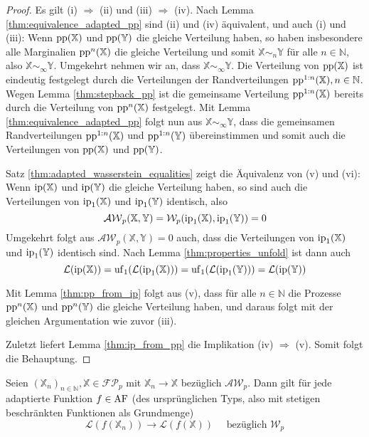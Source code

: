    \begin{proof}
        Es gilt (i) $\Rightarrow$ (ii) und (iii) $\Rightarrow$ (iv). Nach Lemma \ref{thm:equivalence_adapted_pp} sind (ii) und (iv) äquivalent, und auch (i) und (iii): Wenn $\operatorname{pp}(\mathbb{X})$ und $\operatorname{pp}(\mathbb{Y})$ die gleiche Verteilung haben, so haben insbesondere alle Marginalien $\operatorname{pp}^n(\mathbb{X})$ die gleiche Verteilung und somit $\mathbb{X}\sim_n \mathbb{Y}$ für alle $n\in\mathbb{N}$, also $\mathbb{X} \sim_{\infty} \mathbb{Y}$. Umgekehrt nehmen wir an, dass $\mathbb{X}\sim_{\infty}\mathbb{Y}$. Die Verteilung von $\operatorname{pp}(\mathbb{X})$ ist eindeutig festgelegt durch die Verteilungen der Randverteilungen $\operatorname{pp}^{1:n}(\mathbb{X}), n\in\mathbb{N}$. Wegen Lemma \ref{thm:stepback_pp} ist die gemeinsame Verteilung $\operatorname{pp}^{1:n}(\mathbb{X})$ bereits durch die Verteilung von $\operatorname{pp}^n(\mathbb{X})$ festgelegt. Mit Lemma \ref{thm:equivalence_adapted_pp} folgt nun aus $\mathbb{X} \sim_\infty\mathbb{Y}$, dass die gemeinsamen Randverteilungen $\operatorname{pp}^{1:n}(\mathbb{X})$ und $\operatorname{pp}^{1:n}(\mathbb{Y})$ übereinstimmen und somit auch die Verteilungen von $\operatorname{pp}(\mathbb{X})$ und $\operatorname{pp}(\mathbb{Y})$.

        Satz \ref{thm:adapted_wasserstein_equalities} zeigt die Äquivalenz von (v) und (vi): Wenn $\operatorname{ip}(\mathbb{X})$ und $\operatorname{ip}(\mathbb{Y})$ die gleiche Verteilung haben, so sind auch die Verteilungen von $\operatorname{ip}_1(\mathbb{X})$ und $\operatorname{ip}_1(\mathbb{Y})$ identisch, also
        $$\mathcal{AW}_p(\mathbb{X,Y}) = \mathcal{W}_p(\operatorname{ip}_1(\mathbb{X}), \operatorname{ip}_1(\mathbb{Y})) = 0$$
        Umgekehrt folgt aus $\mathcal{AW}_p(\mathbb{X}, \mathbb{Y})=0$ auch, dass die Verteilungen von $\operatorname{ip}_1(\mathbb{X})$ und $\operatorname{ip}_1(\mathbb{Y})$ identisch sind. Nach Lemma \ref{thm:properties_unfold} ist dann auch
        $$\mathcal{L}(\operatorname{ip}(\mathbb{X})) = \operatorname{uf}_1(\mathcal{L}(\operatorname{ip}_1(\mathbb{X}))) = \operatorname{uf}_1(\mathcal{L}(\operatorname{ip}_1(\mathbb{Y}))) = \mathcal{L}(\operatorname{ip}(\mathbb{Y}))$$

        Mit Lemma \ref{thm:pp_from_ip} folgt aus (v), dass für alle $n\in\mathbb{N}$ die Prozesse $\operatorname{pp}^n(\mathbb{X})$ und $\operatorname{pp}^n(\mathbb{Y})$ die gleiche Verteilung haben, und daraus folgt mit der gleichen Argumentation wie zuvor (iii).

        Zuletzt liefert Lemma \ref{thm:ip_from_pp} die Implikation (iv) $\Rightarrow$ (v). Somit folgt die Behauptung.
    \end{proof}
    \begin{proposition}\label{thm:adapted_continuity}
        Seien $(\mathbb{X}_n)_{n\in\mathbb{N}}, \mathbb{X} \in \mathcal{FP}_p$ mit $\mathbb{X}_n \rightarrow \mathbb{X}$ bezüglich $\mathcal{AW}_p$. Dann gilt für jede adaptierte Funktion $f \in \operatorname{AF}$ (des ursprünglichen Typs, also mit stetigen beschränkten Funktionen als Grundmenge) 
        $$\mathcal{L}(f(\mathbb{X}_n)) \rightarrow \mathcal{L}(f(\mathbb{X})) \quad \text { bezüglich } \mathcal{W}_p$$
    \end{proposition}
